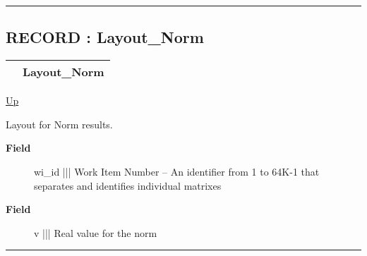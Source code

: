 \rule{\textwidth}{0.4pt}
\subsection*{RECORD : Layout\_Norm}
\hypertarget{ecldoc:pbblas.types.layout_norm}{}

{\renewcommand{\arraystretch}{1.5}
\begin{tabularx}{\textwidth}{|>{\raggedright\arraybackslash}l|X|}
\hline
\hspace{0pt} & Layout\_Norm \\
\hline
\end{tabularx}
}

\hyperlink{ecldoc:PBblas.Types}{Up}

\par
Layout for Norm results.

\par
\begin{description}
\item [\textbf{Field}] wi\_id ||| Work Item Number -- An identifier from 1 to 64K-1 that separates and identifies individual matrixes
\item [\textbf{Field}] v ||| Real value for the norm
\end{description}

\rule{\textwidth}{0.4pt}


